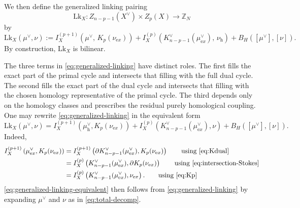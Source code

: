 \documentclass[dvipsnames,a4paper]{article}
\numberwithin{equation}{section}
\theoremstyle{definition}
\theoremstyle{remark}
\newcommand{\Lk}{\mathrm{Lk}}
\begin{document}
We then define the generalized linking pairing
\begin{equation}
	\Lk_X:
	Z_{n-p-1}(X^\vee)\times Z_p(X)\rightarrow \mathbb Z_N
	\label{eq:L-map}
\end{equation}
by
\begin{equation}
	\Lk_X(\mu^\vee,\nu)
	:=
	I_X^{(p+1)}\left(\mu^\vee,\,K_p(\nu_{\mathrm ex})\right)
	+
	I_X^{(p)}\left(K^\vee_{n-p-1}(\mu^\vee_{\mathrm ex}),\,\nu_{\mathrm h}\right)
	+
	B_H\left([\mu^\vee],[\nu]\right).
	\label{eq:generalized-linking}
\end{equation}
By construction, \(\Lk_X\) is bilinear.

The three terms in \eqref{eq:generalized-linking} have distinct roles. The first fills
the exact part of the primal cycle and intersects that filling with the full dual cycle.
The second fills the exact part of the dual cycle and intersects that filling with the
chosen homology representative of the primal cycle. The third depends only on the homology
classes and prescribes the residual purely homological coupling. One may rewrite
\eqref{eq:generalized-linking} in the equivalent form
\begin{equation}
	\Lk_X(\mu^\vee,\nu)
	=
	I_X^{(p+1)}\left(\mu^\vee_{\mathrm h},K_p(\nu_{\mathrm ex})\right)
	+
	I_X^{(p)}\left(K^\vee_{n-p-1}(\mu^\vee_{\mathrm ex}),\nu\right)
	+
	B_H\left([\mu^\vee],[\nu]\right).
	\label{eq:generalized-linking-equivalent}
\end{equation}
Indeed,
\begin{equation}
\begin{aligned}
	I_X^{(p+1)}\left(\mu^\vee_{\mathrm ex},K_p(\nu_{\mathrm ex})\right)
	&=
	I_X^{(p+1)}\left(\partial K^\vee_{n-p-1}(\mu^\vee_{\mathrm ex}),K_p(\nu_{\mathrm ex})\right)
	\qquad \text{using \eqref{eq:Kdual}}
	\\
	&=
	I_X^{(p)}\left(K^\vee_{n-p-1}(\mu^\vee_{\mathrm ex}),\partial K_p(\nu_{\mathrm ex})\right)
	\qquad \text{using \eqref{eq:intersection-Stokes}}
	\\
	&=
	I_X^{(p)}\left(K^\vee_{n-p-1}(\mu^\vee_{\mathrm ex}),\nu_{\mathrm ex}\right).
	\qquad \text{using \eqref{eq:Kp}}
\end{aligned}
\end{equation}
\eqref{eq:generalized-linking-equivalent} then follows from \eqref{eq:generalized-linking} by expanding $\mu^\vee$ and $\nu$ as in \eqref{eq:total-decomp}.
\end{document}
